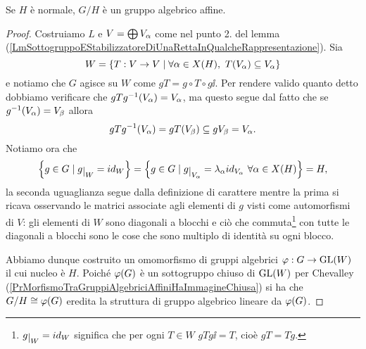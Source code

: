 \begin{proposition}
Se $H$ \`e normale, $G/H$ \`e un gruppo algebrico affine.
\end{proposition}
\begin{proof}
Costruiamo $L$ e $V=\bigoplus V_\alpha$ come nel punto 2. del lemma (\ref{LmSottogruppoEStabilizzatoreDiUnaRettaInQualcheRappresentazione}). Sia
\[W=\left\{{T:V\to V\mid \forall \alpha\in X(H),\ T(V_\alpha)\subseteq V_\alpha}\right\}\]
e notiamo che $G$ agisce su $W$ come $gT=g\circ T\circ g\ii$. Per rendere valido quanto detto dobbiamo verificare che $g T g^{-1}(V_\alpha)=V_\alpha$, ma questo segue dal fatto che se $g^{-1}(V_\alpha)=V_\beta$ allora
\[g T g^{-1}(V_\alpha)=gT(V_\beta)\subseteq gV_\beta=V_\alpha.\]
Notiamo ora che
\[\cpa{g\in G\mid g\res W=id_W}=\cpa{g\in G\mid g\res{V_\al}=\la_\al id_{V_\al}\ \forall \al\in X(H)}=H,\]
la seconda uguaglianza segue dalla definizione di carattere mentre la prima si ricava osservando le matrici associate agli elementi di $g$ visti come automorfismi di $V$: gli elementi di $W$ sono diagonali a blocchi e ci\`o che commuta\footnote{$g\res W=id_W$ significa che per ogni $T\in W$ $gTg\ii=T$, cio\`e $gT=Tg$.} con tutte le diagonali a blocchi sono le cose che sono multiplo di identit\`a su ogni blocco.

Abbiamo dunque costruito un omomorfismo di gruppi algebrici $\varphi:G\to \mathrm{GL}(W)$ il cui nucleo \`e $H$. Poich\'e $\varphi(G)$ \`e un sottogruppo chiuso di $\mathrm{GL}(W)$ per Chevalley (\ref{PrMorfismoTraGruppiAlgebriciAffiniHaImmagineChiusa}) si ha che $G/H\cong \varphi(G)$ eredita la struttura di gruppo algebrico lineare da $\varphi(G)$.
\end{proof}
